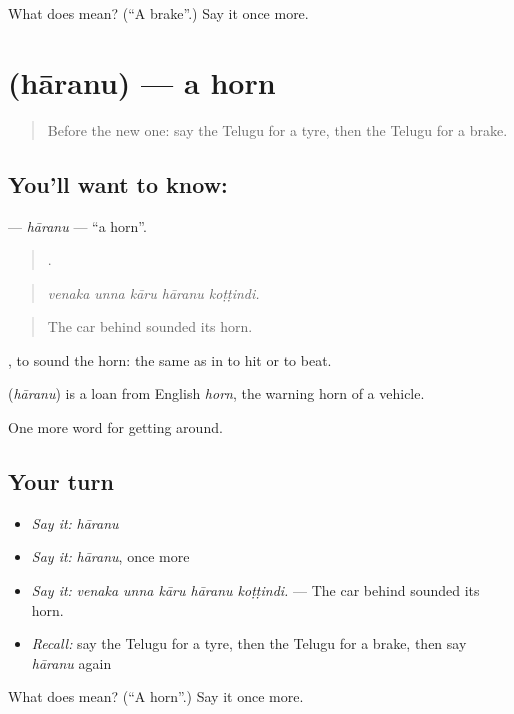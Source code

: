\begin{tcolorbox}[breakable,colback=teal!4,colframe=teal!35!black,title={Before you move on}]
What does  mean? (\textquotedblleft{}A brake\textquotedblright{}.) Say it once more.
\end{tcolorbox}
\section[\texorpdfstring{\te{హారను} (hāranu)}{హారను (hāranu)}]{ (hāranu) — a horn}

\label{lesson:TE-C443-haranu}



\begin{quote}
Before the new one: say the Telugu for a tyre, then the Telugu for a brake.
\end{quote}

\subsection*{You'll want to know: }
\textbf{} — \emph{hāranu} — \textquotedblleft{}a horn\textquotedblright{}.

\begin{quote}
    .
\end{quote}

\begin{quote}
\emph{venaka unna kāru hāranu koṭṭindi.}
\end{quote}

\begin{quote}
The car behind sounded its horn.
\end{quote}

 , to sound the horn: the same  as in to hit or to beat.

\begin{cousinweb}
\textbf{} (\emph{hāranu}) is a loan from English \emph{horn}, the warning horn of a vehicle.
\end{cousinweb}

\begin{grammarlens}[title={What you've built}]
One more word for getting around.
\end{grammarlens}

\subsection*{Your turn}
\begin{itemize}
\raggedright
  \item \emph{Say it:} \emph{hāranu}
  \item \emph{Say it:} \emph{hāranu}, once more
  \item \emph{Say it:} \emph{venaka unna kāru hāranu koṭṭindi.} — The car behind sounded its horn.
  \item \emph{Recall:} say the Telugu for a tyre, then the Telugu for a brake, then say \emph{hāranu} again
\end{itemize}

\begin{tcolorbox}[breakable,colback=teal!4,colframe=teal!35!black,title={Before you move on}]
What does  mean? (\textquotedblleft{}A horn\textquotedblright{}.) Say it once more.
\end{tcolorbox}
